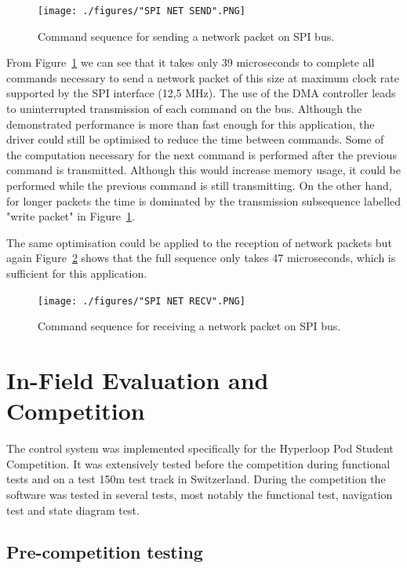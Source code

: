 \begin{figure}[H]
    \centering \texttt{[image: ./figures/"SPI NET SEND".PNG]}
    \caption{Command sequence for sending a network packet on SPI bus.}
    \label{fig:net_send}
\end{figure}

From Figure~\ref{fig:net_send} we can see that it takes only 39 microseconds to complete all commands necessary to send a network packet of this size at maximum clock rate supported by the SPI interface (12,5 MHz). The use of the DMA controller leads to uninterrupted transmission of each command on the bus. Although the demonstrated performance is more than fast enough for this application, the driver could still be optimised to reduce the time between commands. Some of the computation necessary for the next command is performed after the previous command is transmitted. Although this would increase memory usage, it could be performed while the previous command is still transmitting. On the other hand, for longer packets the time is dominated by the transmission subsequence labelled "write packet" in Figure~\ref{fig:net_send}.

The same optimisation could be applied to the reception of network packets but again Figure~\ref{fig:net_recv} shows that the full sequence only takes 47 microseconds, which is sufficient for this application. 

\begin{figure}[H]
    \centering \texttt{[image: ./figures/"SPI NET RECV".PNG]}
    \caption{Command sequence for receiving a network packet on SPI bus.}
    \label{fig:net_recv}
\end{figure}

\section{In-Field Evaluation and Competition}

The control system was implemented specifically for the Hyperloop Pod Student Competition. It was extensively tested before the competition during functional tests and on a test 150m test track in Switzerland. During the competition the software was tested in several tests, most notably the functional test, navigation test and state diagram test.

\subsection{Pre-competition testing}

